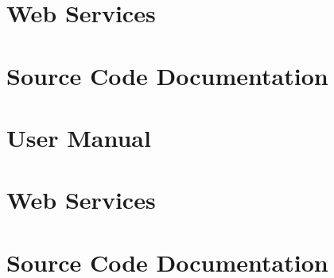 \appendix


\chapter{\boldpathcasemaw Web Services}
\label{ch:maw_web_services}


\chapter{\mawapp Source Code Documentation}
\label{ch:maw_code_docs}


\chapter{\keggapp User Manual}
\label{ch:kegg_manual}



\chapter{\boldpathcasekegg Web Services}
\label{ch:kegg_web_services}


\chapter{\keggapp Source Code Documentation}
\label{ch:kegg_code_docs}
\singlespace

\doublespace


\singlespace
%
\doublespace






